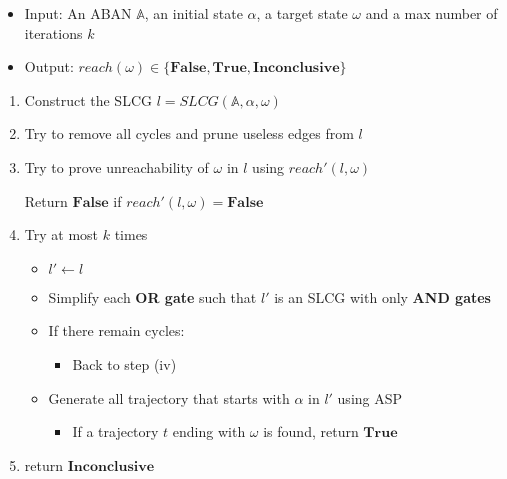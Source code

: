 \begin{itemize}
    \item Input: An ABAN $\mathbb{A}$, an initial state $\alpha$, a target state $\omega$ and a max number of iterations $k$
    \item Output: $reach(\omega)\in\{\mathbf{False},\mathbf{True},\mathbf{Inconclusive}\}$
\end{itemize}
\begin{enumerate}
    \item Construct the SLCG $l=SLCG(\mathbb{A},\alpha,\omega)$
    \item Try to remove all cycles and prune useless edges from $l$
    \item Try to prove unreachability of $\omega$ in $l$ using $reach'(l,\omega)$ 
    
    Return $\mathbf{False}$ if $reach'(l,\omega)=\textbf{False}$
    \item Try at most $k$ times
    \begin{itemize}
    \item $l'\gets l$
    \item Simplify each \textbf{OR gate} such that $l'$ is an SLCG with only \textbf{AND gates}
    \item If there remain cycles:
        \begin{itemize}
            \item Back to step (iv)
        \end{itemize}
    \item Generate all trajectory that starts with $\alpha$ in $l'$ using ASP
    \begin{itemize}
        \item If a trajectory $t$ ending with $\omega$ is found, return $\mathbf{True}$
    \end{itemize}
    \end{itemize}
    \item return $\mathbf{Inconclusive}$
\end{enumerate}


